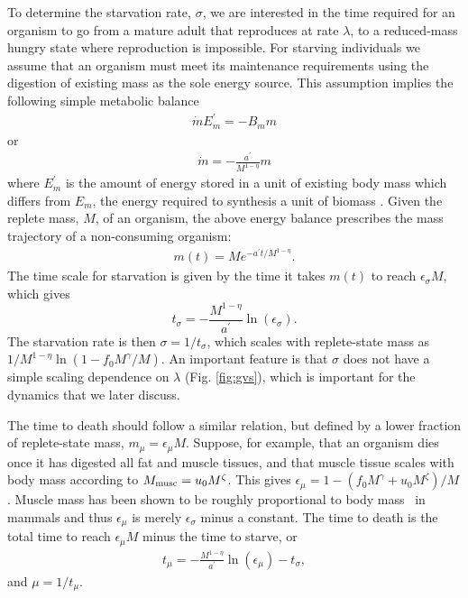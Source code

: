 \documentclass{pnastwo}
\begin{document}
\begin{article}
To determine the starvation rate, $\sigma$, we are interested in the time
required for an organism to go from a mature adult that reproduces at rate
$\lambda$, to a
reduced-mass hungry state where reproduction is impossible.  For starving individuals we assume that an organism must meet its maintenance requirements using the digestion of existing mass as the sole energy source.
This assumption implies the following simple metabolic balance
\begin{eqnarray}
\dot{m}E_{m}^{\prime}=-B_{m}m
\end{eqnarray}
or
\begin{eqnarray}
\dot{m}=-\frac{a^{\prime}}{M^{1-\eta}}m
\end{eqnarray}
where $E_{m}^{\prime}$ is the amount of energy stored in a unit of existing
body mass which differs from $E_{m}$, the energy required to
synthesis a unit of biomass \cite{hou}. Given the replete mass, $M$, of an organism, the
above energy balance prescribes the mass trajectory of a non-consuming
organism:
\begin{eqnarray}
\label{mt}
m\left(t\right)=Me^{-a^{\prime}t/M^{1-\eta}}.
\end{eqnarray}
The time scale for starvation is
given by the time it takes $m(t)$ to reach $\epsilon_{\sigma} M$, which gives
\begin{equation}
\label{eq:sigma}
t_{\sigma}=-\frac{M^{1-\eta}}{a^{\prime}}\ln\left(\epsilon_{\sigma}\right).
\end{equation}
The starvation rate is then $\sigma=1/t_{\sigma}$, which scales with
replete-state mass as $1/M^{1-\eta}\ln\left(1-f_{0}M^{\gamma}/M\right)$.  An important
feature is that $\sigma$ does not have a simple scaling dependence on
$\lambda$ (Fig. \ref{fig:gvs}), which is important for the dynamics that we
later discuss.

The time to death should follow a similar relation, but defined by a lower
fraction of replete-state mass, $m_{\mu}=\epsilon_{\mu} M$.
Suppose, for example, that an organism dies once it has digested all fat and
muscle tissues, and that muscle tissue scales with body mass according to
$M_{\rm musc}=u_{0}M^{\zeta}$.  This gives
$\epsilon_{\mu}=1-\left(f_{0}M^{\gamma}+u_{0}M^{\zeta}\right)/M$. Muscle
mass has been shown to be roughly proportional to body mass~\cite{Folland:2008ij} in
mammals and thus $\epsilon_{\mu}$ is merely $\epsilon_{\sigma}$ minus a constant. The time to death is the total time to reach $\epsilon_{\mu}M$ minus the time to starve, or
\begin{eqnarray}
t_{\mu}=-\frac{M^{1-\eta}}{a^{\prime}}\ln\left(\epsilon_{\mu}\right)-t_{\sigma},
\end{eqnarray}
and $\mu=1/t_{\mu}$.


\end{article}
\end{document}
